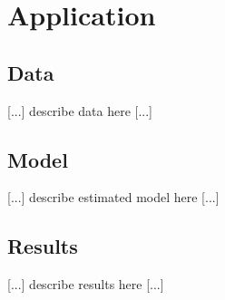 \section{Application}

\subsection{Data}

\begin{center}
    [...] describe data here [...]
\end{center}


\subsection{Model}

\begin{center}
    [...] describe estimated model here [...]
\end{center}


\subsection{Results}

\begin{center}
    [...] describe results here [...]
\end{center}
